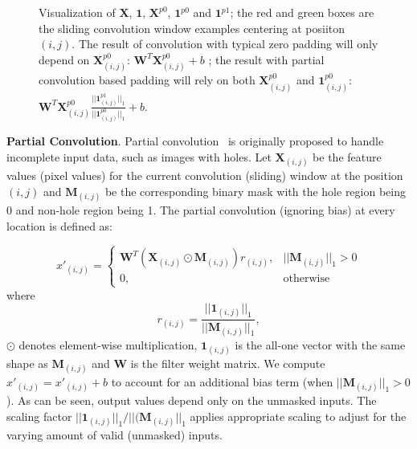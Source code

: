 \documentclass[10pt,twocolumn,letterpaper]{article}
\begin{document}
\begin{figure*}[h]
\centering
    \caption{Visualization of $\mathbf{X}$, $\mathbf{1}$, $\mathbf{X}^{p0}$, $\mathbf{1}^{p0}$ and $\mathbf{1}^{p1}$; the red and green boxes are the sliding convolution window examples centering at posiiton $(i, j)$. The result of convolution with typical zero padding will only depend on $\mathbf{X}^{p0}_{(i,j)}$: $\mathbf{W}^T\mathbf{X}^{p0}_{(i,j)}+b$ ; the result with partial convolution based padding will rely on both $\mathbf{X}^{p0}_{(i,j)}$ and $\mathbf{1}^{p0}_{(i,j)}$: $\mathbf{W}^T\mathbf{X}^{p0}_{(i,j)}\frac{||\mathbf{1}^{p1}_{(i,j)}||_1}{||\mathbf{1}^{p0}_{(i,j)}||_1} + b$.}
    \label{fig:notation}
    \vspace{-.2cm}
\end{figure*}\textbf{Partial Convolution}. Partial convolution~\cite{liu2018image} is originally proposed to handle incomplete input data, such as images with holes. Let $\mathbf{X}_{(i,j)}$ be the feature values (pixel values) for the current convolution (sliding) window at the position $(i,j)$ and $\mathbf{M}_{(i,j)}$ be the corresponding binary mask with the hole region being 0 and non-hole region being 1. The partial convolution (ignoring bias) 
at every location is defined as:

\begin{equation}
\label{eq:partconv}
    x'_{(i,j)} = \begin{cases}
     \mathbf{W}^T(\mathbf{X}_{(i,j)}\odot\mathbf{M}_{(i,j)})r_{(i,j)},&||\mathbf{M}_{(i,j)}||_{1}>0  \\
        0,&\text{otherwise}
    \end{cases}
\end{equation}where
\begin{equation}
    r_{(i,j)} = \frac{||\mathbf{1}_{(i,j)}||_1}{||\mathbf{M}_{(i,j)}||_1},
\end{equation}$\odot$ denotes element-wise multiplication, $\mathbf{1}_{(i,j)}$ is the all-one vector with the same shape as $\mathbf{M}_{(i,j)}$ and $\mathbf{W}$ is the filter weight matrix. We compute $x'_{(i,j)}=x'_{(i,j)}+b$ to account for an additional bias term (when $||\mathbf{M}_{(i,j)}||_{1}>0$). As can be seen, output values depend only on the unmasked inputs. The scaling factor $||\mathbf{1}_{(i,j)}||_1/||(\mathbf{M}_{(i,j)}||_1$ applies appropriate scaling to adjust for the varying amount of valid (unmasked) inputs.
\end{document}

